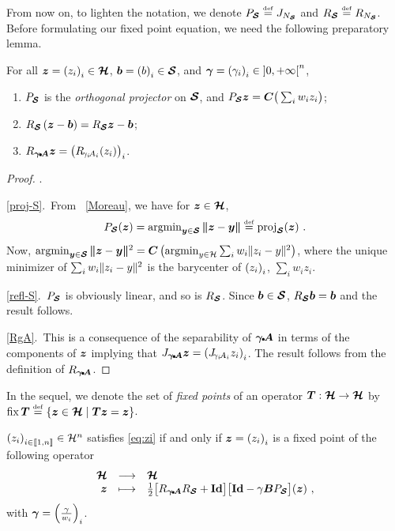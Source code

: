 From now on, to lighten the notation, we denote $\PS \eqdef J_{N_{\bSs}}$ and $\RS \eqdef R_{N_{\bSs}}$. Before formulating our fixed point equation, we need the following preparatory lemma.

\begin{lemma} For all $\bz = \pa{z_i}_i \in \bHh$, $\bb = \pa{b}_i \in \bSs$, and $\bga = \pa{\ga_i}_i \in {]0,\pinfty[}^n$,
\begin{enumerate}[label={\rm (\roman{*})}, ref={\rm (\roman{*})}]
\item{\label{proj-S}} $\PS$ is the \textit{orthogonal projector} on $\bSs$, and $\PS \bz = \bC\bpa{\sum_i w_i z_i}$;
\item{\label{refl-S}} $\RS \pa{ \bz - \bb } = \RS \bz - \bb$;
\item{\label{RgA}} $\RgA \bz = \bpa{\RgiAi(z_i)}_i$.
\end{enumerate}
\label{lem:JRSA}
\end{lemma}

\ifx\siam\undefined \begin{proof} . \fi

\ref{proj-S}.~From ~\ref{Moreau}, we have for $\bz \in \bHh$, 
%
\begin{equation*}
\PS(\bz) = {\argmin_{\by \in \bSs} \bnorm{\bz - \by}} \eqdef \proj_{\bSs}(\bz)~.
\end{equation*}
% 
Now, ${\argmin_{\by \in \bSs} \bnorm{\bz - \by}^2} = \bC\pa{\argmin_{y \in \Hh} \sum_i w_i \norm{z_i - y}^2}$, where the uni\-que minimizer of $\sum_i w_i \norm{z_i - y}^2$ is the barycenter of $\pa{z_i}_i$, \ie $\sum_i w_i z_i$.

\ref{refl-S}.~$\PS$ is obviously linear, and so is $\RS$. Since $\bb \in \bSs$, $\RS \bb = \bb$ and the result follows.

\ref{RgA}.~This is a consequence of the separability of $\bgaA$ in terms of the components of $\bz$ implying that $\JgA \bz = \pa{\JgiAi z_i}_i$. The result follows from the definition of $\RgA$.
\ifx\siam\undefined \end{proof} \else \endproof \fi

In the sequel, we denote the set of \textit{fixed points} of an operator $\bT : \bHh \to \bHh$ by $\fix \bT \eqdef \setdef{\bz \in \bHh}{\bT \bz = \bz}$.
\begin{proposition}
$\pa{z_i}_{i \in \bbket{1,n}} \in \Hh^n$ satisfies \eqref{eq:zi} if and only if  $\bz = \pa{z_i}_i$ is a fixed point of the following operator
%
\begin{equation}\label{eq:operator}
\begin{array}{rcl} \bHh & \longrightarrow & \bHh \\
	\bz & \longmapsto & \half \big[ \RgA  \RS + \bId \big]  \big[ \bId - \ga \bBJ \big](\bz) ~,
\end{array}
\end{equation}
%
with $\bga = \pa{\frac{\ga}{w_i}}_i$.
\label{prop:fix-z}
\end{proposition}

